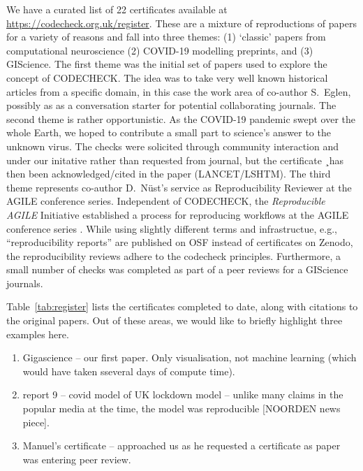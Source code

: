 \documentclass[12pt]{article}
\begin{document}
We have a curated list of 22 certificates available at
\url{https://codecheck.org.uk/register}. These are a mixture of
reproductions of papers for a variety of reasons and fall into three themes:
(1) `classic' papers from computational neuroscience
(2) COVID-19 modelling preprints, and
(3) GIScience.  
The first theme was the initial set of papers used to explore the concept
of CODECHECK. The idea was to take very well known historical articles from a 
specific domain, in this case the work area of co-author S.~Eglen, possibly 
as as a conversation starter for potential collaborating journals.
The second theme is rather opportunistic. As the COVID-19 pandemic swept
over the whole Earth, we hoped to contribute a small part to science's answer
to the unknown virus. The checks were solicited through community interaction
and under our initative rather than requested from journal, but the certificate
¸has then been acknowledged/cited in the paper (LANCET/LSHTM). %
The third theme represents co-author D.~N\"ust's service as Reproducibility
Reviewer at the AGILE conference series.
Independent of CODECHECK, the \emph{Reproducible AGILE} Initiative \cite{reproducible_agile}
established a process for reproducing workflows at the AGILE conference
series \cite{nust_improving_2020}.
While using slightly different terms and infrastructue, e.g., ``reproducibility
reports'' are published on OSF instead of certificates on Zenodo, the 
reproducibility reviews adhere to the codecheck principles.
Furthermore, a small number of checks was completed as part of a peer reviews
for a GIScience journals.

Table~\ref{tab:register} lists the certificates completed to date,
along with citations to the original papers.
Out of these areas, we would like to briefly highlight three examples here.

\begin{enumerate}
\def\labelenumi{\arabic{enumi}.}
\item
  Gigascience -- our first paper. Only visualisation, not machine
  learning (which would have taken sseveral days of compute time).
\item
  report 9 -- covid model of UK lockdown model -- unlike many claims
  in the popular media at the time, the model was reproducible
  [NOORDEN news piece]. 
\item
  Manuel's certificate -- approached us as he requested a certificate
  as paper was entering peer review.
\end{enumerate}
\end{document}
